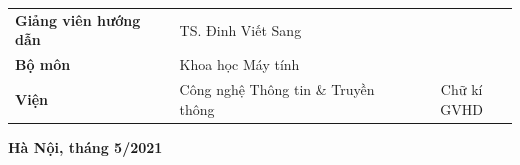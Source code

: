 \documentclass[12pt]{extreport}
\begin{document}
\vspace{1.5cm}
\begin{center}
    \begin{tabular}{p{23mm} l c}
        \textbf{Giảng viên hướng dẫn} & TS. Đinh Viết Sang                  &             \\
        \textbf{Bộ môn}               & Khoa học Máy tính                   & \hrulefill  \\
        \textbf{Viện}                 & Công nghệ Thông tin \& Truyền thông & Chữ kí GVHD \\
    \end{tabular}
\end{center}

\vspace{1.0cm}
\begin{center}
    \textbf{{Hà Nội, tháng 5/2021}}\\
\end{center}








\end{document}
